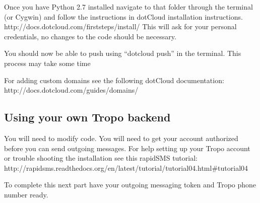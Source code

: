 Once you have Python 2.7 installed navigate to that folder through the terminal (or Cygwin) and follow the instructions in dotCloud installation instructions. http://docs.dotcloud.com/firststeps/install/
This will ask for your personal credentials, no changes to the code should be necessary.

You should now be able to push using “dotcloud push” in the terminal. This process may take some time

For adding custom domains see the following dotCloud documentation: http://docs.dotcloud.com/guides/domains/

\subsection*{Using your own Tropo backend}
You will need to modify code. You will need to get your account authorized before you can send outgoing messages. For help setting up your Tropo account  or trouble shooting the installation see this rapidSMS tutorial: http://rapidsms.readthedocs.org/en/latest/tutorial/tutorial04.html#tutorial04

To complete this next part have your outgoing messaging token and Tropo phone number ready. 

